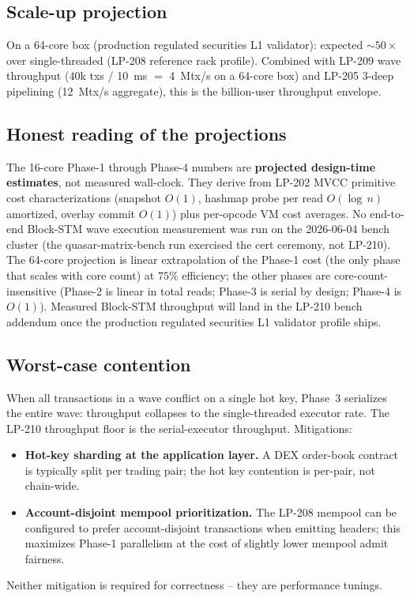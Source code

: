 \subsection{Scale-up projection}

On a 64-core box (production regulated securities L1 validator): expected
$\sim 50\times$ over single-threaded (LP-208 reference rack
profile). Combined with LP-209 wave throughput
($40$k txs / \SI{10}{\milli\second} $=$ \SI{4}{\mega tx/s} on a
64-core box) and LP-205 3-deep pipelining
(\SI{12}{\mega tx/s} aggregate), this is the billion-user
throughput envelope.

\subsection{Honest reading of the projections}

The 16-core Phase-1 through Phase-4 numbers are \textbf{projected
design-time estimates}, not measured wall-clock. They derive from
LP-202 MVCC primitive cost characterizations (snapshot $O(1)$,
hashmap probe per read $O(\log\,n)$ amortized, overlay commit $O(1)$)
plus per-opcode VM cost averages. No end-to-end Block-STM wave
execution measurement was run on the 2026-06-04 bench cluster (the
quasar-matrix-bench run exercised the cert ceremony, not LP-210).
The 64-core projection is linear extrapolation of the Phase-1 cost
(the only phase that scales with core count) at $75\%$ efficiency;
the other phases are core-count-insensitive (Phase-2 is linear in
total reads; Phase-3 is serial by design; Phase-4 is $O(1)$).
Measured Block-STM throughput will land in the LP-210 bench
addendum once the production regulated securities L1 validator profile ships.

\subsection{Worst-case contention}

When all transactions in a wave conflict on a single hot key,
Phase~3 serializes the entire wave: throughput collapses to the
single-threaded executor rate. The LP-210 throughput floor is the
serial-executor throughput. Mitigations:

\begin{itemize}[leftmargin=2em,nosep]
\item \textbf{Hot-key sharding at the application layer.} A DEX
  order-book contract is typically split per trading pair; the hot
  key contention is per-pair, not chain-wide.
\item \textbf{Account-disjoint mempool prioritization.} The LP-208
  mempool can be configured to prefer account-disjoint transactions
  when emitting headers; this maximizes Phase-1 parallelism at the
  cost of slightly lower mempool admit fairness.
\end{itemize}

Neither mitigation is required for correctness -- they are
performance tunings.
